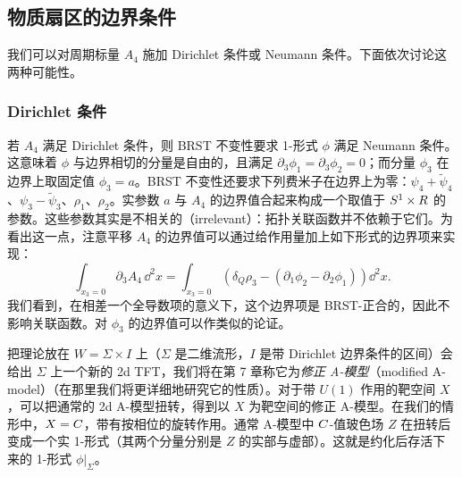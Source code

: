 
\subsection{物质扇区的边界条件}

我们可以对周期标量 $A_4$ 施加 Dirichlet 条件或 Neumann 条件。下面依次讨论这两种可能性。

\subsubsection{Dirichlet 条件}

若 $A_4$ 满足 Dirichlet 条件，则 BRST 不变性要求 1-形式 $\phi$ 满足 Neumann 条件。这意味着 $\phi$ 与边界相切的分量是自由的，且满足 $\partial_3\phi_1=\partial_3\phi_2=0$；而分量 $\phi_3$ 在边界上取固定值 $\phi_3=a$。BRST 不变性还要求下列费米子在边界上为零：$\psi_4+\tilde\psi_4$、$\psi_3-\tilde\psi_3$、$\rho_1$、$\rho_2$。实参数 $a$ 与 $A_4$ 的边界值合起来构成一个取值于 $S^1\times R$ 的参数。这些参数其实是不相关的（irrelevant）：拓扑关联函数并不依赖于它们。为看出这一点，注意平移 $A_4$ 的边界值可以通过给作用量加上如下形式的边界项来实现：
\[
  \int_{x_3=0}\partial_3A_4\,\dd^2x
  =\int_{x_3=0}\left(\delta_Q\rho_3-(\partial_1\phi_2-\partial_2\phi_1)\right)\dd^2x .
\]
我们看到，在相差一个全导数项的意义下，这个边界项是 BRST-正合的，因此不影响关联函数。对 $\phi_3$ 的边界值可以作类似的论证。



把理论放在 $W=\Sigma\times I$ 上（$\Sigma$ 是二维流形，$I$ 是带 Dirichlet 边界条件的区间）会给出 $\Sigma$ 上一个新的 2d TFT，我们将在第 7 章称它为\emph{修正 A-模型}（modified A-model）（在那里我们将更详细地研究它的性质）。对于带 $U(1)$ 作用的靶空间 $X$，可以把通常的 2d A-模型扭转，得到以 $X$ 为靶空间的修正 A-模型。在我们的情形中，$X=C$，带有按相位的旋转作用。通常 A-模型中 $C$-值玻色场 $Z$ 在扭转后变成一个实 1-形式（其两个分量分别是 $Z$ 的实部与虚部）。这就是约化后存活下来的 1-形式 $\phi|_\Sigma$。

